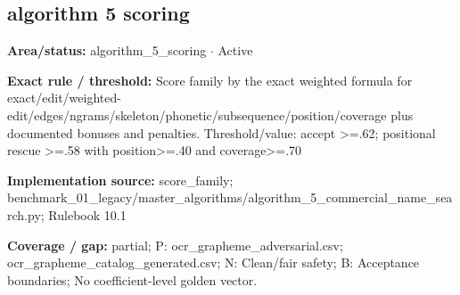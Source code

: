 \subsection*{algorithm 5 scoring}
\begin{tcolorbox}[enhanced,breakable,colback=white,colframe=Muted!45,boxrule=0.45pt,arc=1.5pt,left=6pt,right=6pt,top=5pt,bottom=5pt,title={\texttt{A5-SCORE-FAMILY-14}},title after break={\texttt{A5-SCORE-FAMILY-14}\ (continued)},fonttitle=\headingfont\bfseries\color{Navy},coltitle=Navy]
\textbf{Area/status:} algorithm\_\allowbreak{}5\_\allowbreak{}scoring $\boldsymbol{\cdot}$ Active\par
\smallskip
\textbf{Exact rule / threshold:} Score family by the exact weighted formula for exact/\allowbreak{}edit/\allowbreak{}weighted-edit/\allowbreak{}edges/\allowbreak{}ngrams/\allowbreak{}skeleton/\allowbreak{}phonetic/\allowbreak{}subsequence/\allowbreak{}position/\allowbreak{}coverage plus documented bonuses and penalties. Threshold/\allowbreak{}value: accept >=.62; positional rescue >=.58 with position>=.40 and coverage>=.70\par
\smallskip
\textbf{Implementation source:} score\_\allowbreak{}family; benchmark\_\allowbreak{}01\_\allowbreak{}legacy/\allowbreak{}master\_\allowbreak{}algorithms/\allowbreak{}algorithm\_\allowbreak{}5\_\allowbreak{}commercial\_\allowbreak{}name\_\allowbreak{}search.py; Rulebook 10.1\par
\smallskip
\textbf{Coverage / gap:} partial; P: ocr\_\allowbreak{}grapheme\_\allowbreak{}adversarial.csv; ocr\_\allowbreak{}grapheme\_\allowbreak{}catalog\_\allowbreak{}generated.csv; N: Clean/\allowbreak{}fair safety; B: Acceptance boundaries; No coefficient-level golden vector.
\end{tcolorbox}
\medskip
